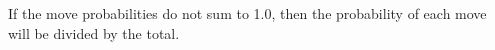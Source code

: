If the move probabilities do not sum to 1.0,
then the probability of each move will be divided by the total.
%
%
%
%
%
%
